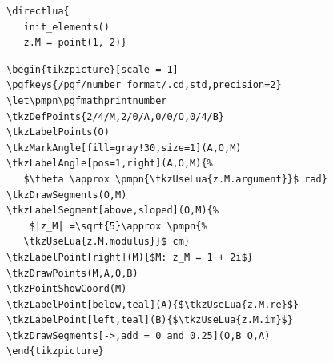 \hspace*{\fill}

\begin{verbatim}
\directlua{
   init_elements()
   z.M = point(1, 2)}
\end{verbatim}
\let\pmpn\pgfmathprintnumber
\DeleteShortVerb{\|}

\begin{verbatim}
\begin{tikzpicture}[scale = 1]
\pgfkeys{/pgf/number format/.cd,std,precision=2}
\let\pmpn\pgfmathprintnumber
\tkzDefPoints{2/4/M,2/0/A,0/0/O,0/4/B}
\tkzLabelPoints(O)
\tkzMarkAngle[fill=gray!30,size=1](A,O,M)
\tkzLabelAngle[pos=1,right](A,O,M){%
   $\theta \approx \pmpn{\tkzUseLua{z.M.argument}}$ rad}
\tkzDrawSegments(O,M)
\tkzLabelSegment[above,sloped](O,M){%
    $|z_M| =\sqrt{5}\approx \pmpn{%
   \tkzUseLua{z.M.modulus}}$ cm}
\tkzLabelPoint[right](M){$M: z_M = 1 + 2i$}
\tkzDrawPoints(M,A,O,B)
\tkzPointShowCoord(M)
\tkzLabelPoint[below,teal](A){$\tkzUseLua{z.M.re}$}
\tkzLabelPoint[left,teal](B){$\tkzUseLua{z.M.im}$}
\tkzDrawSegments[->,add = 0 and 0.25](O,B O,A)
\end{tikzpicture}
\end{verbatim}


